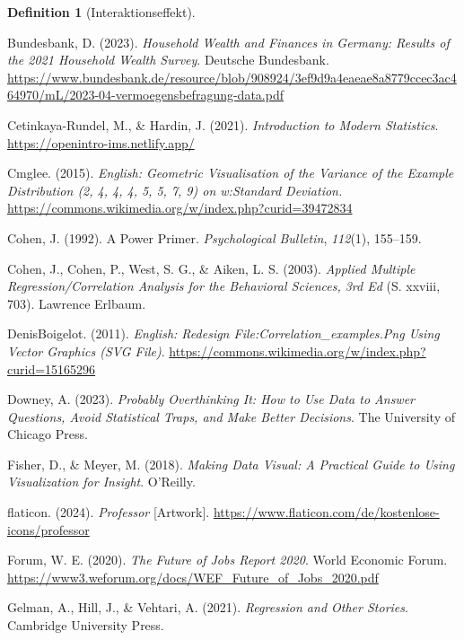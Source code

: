 \documentclass[
  letterpaper,
]{scrbook}
\newlength{\cslhangindent}
\newenvironment{CSLReferences}[2] %
 {\begin{list}{}{%
  \setlength{\itemindent}{0pt}
  \setlength{\leftmargin}{0pt}
  \setlength{\parsep}{0pt}
  \ifodd #1
   \setlength{\leftmargin}{\cslhangindent}
   \setlength{\itemindent}{-1\cslhangindent}
  \fi
  \setlength{\itemsep}{#2\baselineskip}}}
 {\end{list}}
\theoremstyle{definition}
\theoremstyle{definition}
\theoremstyle{definition}
\newtheorem{definition}{Definition}[chapter]
\theoremstyle{remark}
\begin{document}
\begin{definition}[Interaktionseffekt]
\begin{CSLReferences}{1}{0}
Bundesbank, D. (2023). \emph{Household Wealth and Finances in {Germany}:
{Results} of the 2021 Household Wealth Survey}. Deutsche Bundesbank.
\url{https://www.bundesbank.de/resource/blob/908924/3ef9d9a4eaeae8a8779ccec3ac464970/mL/2023-04-vermoegensbefragung-data.pdf}

Cetinkaya-Rundel, M., \& Hardin, J. (2021). \emph{Introduction to
{Modern Statistics}}. \url{https://openintro-ims.netlify.app/}

Cmglee. (2015). \emph{English: {Geometric} Visualisation of the Variance
of the Example Distribution (2, 4, 4, 4, 5, 5, 7, 9) on w:{Standard}
Deviation.}
\url{https://commons.wikimedia.org/w/index.php?curid=39472834}

Cohen, J. (1992). A Power Primer. \emph{Psychological Bulletin},
\emph{112}(1), 155--159.

Cohen, J., Cohen, P., West, S. G., \& Aiken, L. S. (2003). \emph{Applied
Multiple Regression/Correlation Analysis for the Behavioral Sciences,
3rd Ed} (S. xxviii, 703). Lawrence Erlbaum.

DenisBoigelot. (2011). \emph{English: Redesign
{File}:{Correlation}\_examples.Png Using Vector Graphics ({SVG} File)}.
\url{https://commons.wikimedia.org/w/index.php?curid=15165296}

Downey, A. (2023). \emph{Probably Overthinking It: How to Use Data to
Answer Questions, Avoid Statistical Traps, and Make Better Decisions}.
The University of Chicago Press.

Fisher, D., \& Meyer, M. (2018). \emph{Making Data Visual: A Practical
Guide to Using Visualization for Insight}. O'Reilly.

flaticon. (2024). \emph{Professor} {[}Artwork{]}.
\url{https://www.flaticon.com/de/kostenlose-icons/professor}

Forum, W. E. (2020). \emph{The {Future} of {Jobs Report} 2020}. World
Economic Forum.
\url{https://www3.weforum.org/docs/WEF_Future_of_Jobs_2020.pdf}

Gelman, A., Hill, J., \& Vehtari, A. (2021). \emph{Regression and Other
Stories}. Cambridge University Press.


\end{CSLReferences}
\end{definition}
\end{document}

